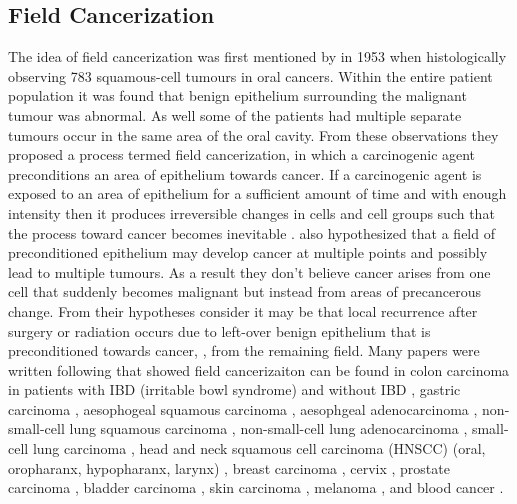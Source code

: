 \documentclass[\main/thesis.tex]{subfiles}
\begin{document}
 
\subsection{Field Cancerization}
 
The idea of field cancerization was first mentioned by \textcite{Slaughter}
in 1953 when histologically observing 783 squamous-cell tumours in oral 
cancers. Within the entire patient population it was found that benign 
epithelium surrounding the malignant tumour was abnormal. As well some of the 
patients had multiple separate tumours occur in the same area of the oral 
cavity. From these observations they proposed a process termed field 
cancerization, in which a carcinogenic agent preconditions an area of 
epithelium towards cancer. If a carcinogenic agent is exposed to an area of 
epithelium for a sufficient amount of time and with enough intensity then it 
produces irreversible changes in cells and cell groups such that the process 
toward cancer becomes inevitable \parencite{Slaughter}. \textcite{Slaughter} 
also hypothesized that a field of preconditioned epithelium may develop cancer 
at multiple points and possibly lead to multiple tumours. As a result they 
don't believe cancer arises from one cell that suddenly becomes malignant but 
instead from areas of precancerous change. From their hypotheses 
\textcite{Slaughter} consider it may be that local recurrence after surgery or 
radiation occurs due to left-over benign epithelium that is preconditioned 
towards cancer, \ie, from the remaining field. Many papers were written 
following \textcite{Slaughter} that showed field cancerizaiton can be found in 
colon carcinoma in patients with 
\parencite{Galandiuk,Leedham,Koizumi,VanDekken2006} IBD (irritable bowl 
syndrome) and without IBD 
\parencite{Alonso,Asada,Damania,Hawthorn,Kamiyama,Kaz,Milicic,Shen}, gastric 
carcinoma 
\parencite{GutierrezGonzalez,Kang,McDonald,Takeshima,Ushijima,Yamanoi,Zaky}, 
aesophogeal squamous carcinoma 
\parencite{Cense,Kammori,Lee,Matsuda,Oka,RoeschEly,Yakoub}, aesophgeal 
adenocarcinoma \parencite{Galipeau,Maley052004,Maley102004,VanDekken1999}, 
non-small-cell lung squamous carcinoma 
\parencite{Chang,Franklin,Kadara2012,McCaughan,Pipinikas,Sozzi,Steiling},
non-small-cell lung adenocarcinoma 
\parencite{Gomperts,Kadara2014,Lin,Nakachi,Weichert},
small-cell lung carcinoma 
\parencite{Gomperts,Kadara2014,Lin,Nakachi,Wirtschafter},
head and neck squamous cell carcinoma (HNSCC) (oral, oropharanx, hypopharanx, 
larynx) 
\parencite{Slaughter,Braakhuis,Angadi,BoscoloRizzo,Califano1996,Narayana,Pentenero,Shaw,VanDerVorst}
, breast carcinoma 
\parencite{Dworkin,Ellsworth,Foschini,Rivenbark,Trujillo2011}, cervix 
\parencite{Chu}, prostate carcinoma \parencite{Haaland,Nonn,Trujillo2012}, 
bladder carcinoma \parencite{Hafner,Vriesema,Wang}, skin carcinoma 
\parencite{Hu,Kanjilal,Stern,Szeimies,Vatve}, melanoma \parencite{Shain}, and 
blood cancer \parencite{Mori,MGreaves,Genovese}.
 
\end{document}
